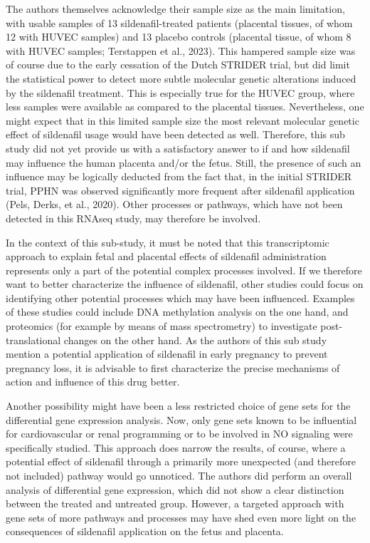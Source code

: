 \documentclass[authordate, reflection]{jote-new-article}
\begin{document}
	The authors themselves acknowledge their sample size as the main limitation, with usable samples of 13 sildenafil-treated patients (placental tissues, of whom 12 with HUVEC samples) and 13 placebo controls (placental tissue, of whom 8 with HUVEC samples; Terstappen et al., 2023). This hampered sample size was of course due to the early cessation of the Dutch STRIDER trial, but did limit the statistical power to detect more subtle molecular genetic alterations induced by the sildenafil treatment. This is especially true for the HUVEC group, where less samples were available as compared to the placental tissues. Nevertheless, one might expect that in this limited sample size the most relevant molecular genetic effect of sildenafil usage would have been detected as well. Therefore, this sub study did not yet provide us with a satisfactory answer to if and how sildenafil may influence the human placenta and/or the fetus. Still, the presence of such an influence may be logically deducted from the fact that, in the initial STRIDER trial, PPHN was observed significantly more frequent after sildenafil application (Pels, Derks, et al., 2020). Other processes or pathways, which have not been detected in this RNAseq study, may therefore be involved.



	In the context of this sub-study, it must be noted that this transcriptomic approach to explain fetal and placental effects of sildenafil administration represents only a part of the potential complex processes involved. If we therefore want to better characterize the influence of sildenafil, other studies could focus on identifying other potential processes which may have been influenced. Examples of these studies could include DNA methylation analysis on the one hand, and proteomics (for example by means of mass spectrometry) to investigate post-translational changes on the other hand. As the authors of this sub study mention a potential application of sildenafil in early pregnancy to prevent pregnancy loss, it is advisable to first characterize the precise mechanisms of action and influence of this drug better.



	Another possibility might have been a less restricted choice of gene sets for the differential gene expression analysis. Now, only gene sets known to be influential for cardiovascular or renal programming or to be involved in NO signaling were specifically studied. This approach does narrow the results, of course, where a potential effect of sildenafil through a primarily more unexpected (and therefore not included) pathway would go unnoticed. The authors did perform an overall analysis of differential gene expression, which did not show a clear distinction between the treated and untreated group. However, a targeted approach with gene sets of more pathways and processes may have shed even more light on the consequences of sildenafil application on the fetus and placenta.
\end{document}
